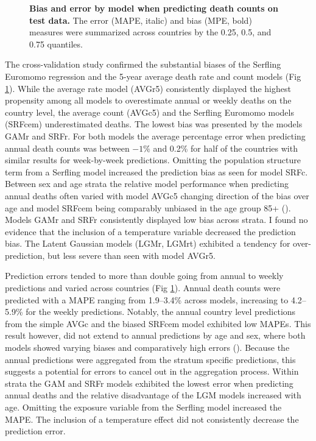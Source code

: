\documentclass[10pt,letterpaper]{article}
\begin{document}

\begin{figure}[!ht]
  \caption{{\bf Bias and error by model when predicting death counts on test data.} The error (MAPE, italic) and bias (MPE, bold) measures were summarized across countries by the 0.25, 0.5, and 0.75 quantiles.}
  \label{Fig4}
\end{figure}

The cross-validation study confirmed the substantial biases of the Serfling Euromomo regression and the 5-year average death rate and count models (Fig \ref{Fig4}). While the average rate model (AVGr5) consistently displayed the highest propensity among all models to overestimate annual or weekly deaths on the country level, the average count (AVGc5) and the Serfling Euromomo models (SRFcem) underestimated deaths. The lowest bias was presented by the models GAMr and SRFr. For both models the average percentage error when predicting annual death counts was between $-1\%$ and 0.2\% for half of the countries with similar results for week-by-week predictions. Omitting the population structure term from a Serfling model increased the prediction bias as seen for model SRFc. Between sex and age strata the relative model performance when predicting annual deaths often varied with model AVGc5 changing direction of the bias over age and model SRFcem being comparably unbiased in the age group 85+ (). Models GAMr and SRFr consistently displayed low bias across strata. I found no evidence that the inclusion of a temperature variable decreased the prediction bias. The Latent Gaussian models (LGMr, LGMrt) exhibited a tendency for over-prediction, but less severe than seen with model AVGr5.

Prediction errors tended to more than double going from annual to weekly predictions and varied across countries (Fig \ref{Fig4}). Annual death counts were predicted with a MAPE ranging from 1.9--3.4\% across models, increasing to 4.2--5.9\% for the weekly predictions. Notably, the annual country level predictions from the simple AVGc and the biased SRFcem model exhibited low MAPEs. This result however, did not extend to annual predictions by age and sex, where both models showed varying biases and comparatively high errors (). Because the annual predictions were aggregated from the stratum specific predictions, this suggests a potential for errors to cancel out in the aggregation process. Within strata the GAM and SRFr models exhibited the lowest error when predicting annual deaths and the relative disadvantage of the LGM models increased with age. Omitting the exposure variable from the Serfling model increased the MAPE. The inclusion of a temperature effect did not consistently decrease the prediction error.
\end{document}
